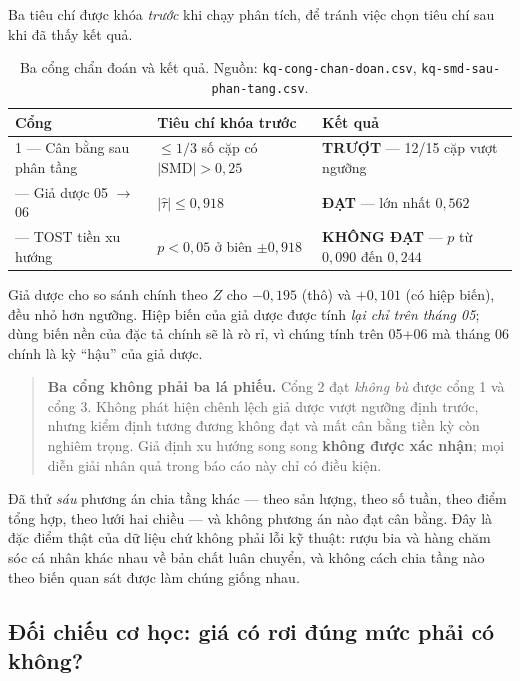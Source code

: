 \documentclass[11pt]{article}
\begin{document}
Ba tiêu chí được khóa \emph{trước} khi chạy phân tích, để tránh việc chọn tiêu chí sau khi đã thấy
kết quả.

\begin{table}[htbp]
  \centering
  \caption{Ba cổng chẩn đoán và kết quả. Nguồn: \texttt{kq-cong-chan-doan.csv},
  \texttt{kq-smd-sau-phan-tang.csv}.}
  \label{tab:ba-cong}
  \begin{tabular}{p{4.2cm}p{4.6cm}p{5.0cm}}
    \toprule
    Cổng & Tiêu chí khóa trước & Kết quả \\
    \midrule
    1 --- Cân bằng sau phân tầng & $\le 1/3$ số cặp có $|\mathrm{SMD}| > 0{,}25$
    & \textbf{TRƯỢT} --- 12/15 cặp vượt ngưỡng \\
    \addlinespace
    2 --- Giả dược 05 $\to$ 06 & $|\hat\tau| \le 0{,}918$
    & \textbf{ĐẠT} --- lớn nhất $0{,}562$ \\
    \addlinespace
    3 --- TOST tiền xu hướng & $p < 0{,}05$ ở biên $\pm 0{,}918$
    & \textbf{KHÔNG ĐẠT} --- $p$ từ $0{,}090$ đến $0{,}244$ \\
    \bottomrule
  \end{tabular}
\end{table}

Giả dược cho so sánh chính theo $Z$ cho $-0{,}195$ (thô) và $+0{,}101$ (có hiệp biến), đều nhỏ hơn
ngưỡng. Hiệp biến của giả dược được tính \emph{lại chỉ trên tháng 05}; dùng biến nền của đặc tả
chính sẽ là rò rỉ, vì chúng tính trên 05+06 mà tháng 06 chính là kỳ ``hậu'' của giả dược.

\begin{quote}
\textbf{Ba cổng không phải ba lá phiếu.} Cổng 2 đạt \emph{không bù} được cổng 1 và cổng 3. Không
phát hiện chênh lệch giả dược vượt ngưỡng định trước, nhưng kiểm định tương đương không đạt và mất
cân bằng tiền kỳ còn nghiêm trọng. Giả định xu hướng song song \textbf{không được xác nhận}; mọi
diễn giải nhân quả trong báo cáo này chỉ có điều kiện.
\end{quote}

Đã thử \emph{sáu} phương án chia tầng khác --- theo sản lượng, theo số tuần, theo điểm tổng hợp,
theo lưới hai chiều --- và không phương án nào đạt cân bằng. Đây là đặc điểm thật của dữ liệu chứ
không phải lỗi kỹ thuật: rượu bia và hàng chăm sóc cá nhân khác nhau về bản chất luân chuyển, và
không cách chia tầng nào theo biến quan sát được làm chúng giống nhau.

\subsection{Đối chiếu cơ học: giá có rơi đúng mức phải có không?}
\label{sec:bam-chuan}
\end{document}
